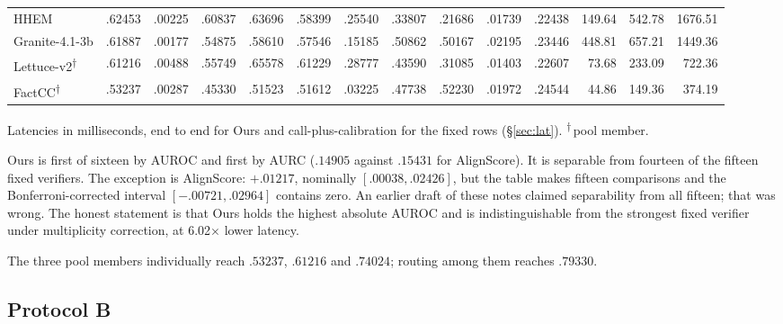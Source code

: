 \documentclass[10pt,a4paper]{article}
\newcommand{\ours}{\textsuperscript{$\dagger$}}
\newcommand{\fix}[1]{\textcolor{red!65!black}{#1}}
\begin{document}
\begin{center}
{\begin{tabular}{lrrrrrrrrrrrrr}
HHEM & .62453 & .00225 & .60837 & .63696 & .58399 & .25540 & .33807 & .21686 & .01739 & .22438 & 149.64 & 542.78 & 1676.51 \\
Granite-4.1-3b & .61887 & .00177 & .54875 & .58610 & .57546 & .15185 & .50862 & .50167 & .02195 & .23446 & 448.81 & 657.21 & 1449.36 \\
Lettuce-v2\ours & .61216 & .00488 & .55749 & .65578 & .61229 & .28777 & .43590 & .31085 & .01403 & .22607 & 73.68 & 233.09 & 722.36 \\
FactCC\ours & .53237 & .00287 & .45330 & .51523 & .51612 & .03225 & .47738 & .52230 & .01972 & .24544 & 44.86 & 149.36 & 374.19 \\
\bottomrule
\end{tabular}}
\end{center}

\noindent\footnotesize Latencies in milliseconds, end to end for Ours and call-plus-calibration
for the fixed rows (\S\ref{sec:lat}). \ours\,pool member.\normalsize

Ours is first of sixteen by AUROC and first by AURC ($.14905$ against $.15431$ for AlignScore).
It is separable from fourteen of the fifteen fixed verifiers. \fix{The exception is AlignScore:}
$+.01217$, nominally $[.00038,.02426]$, but the table makes fifteen comparisons and the
Bonferroni-corrected interval $[-.00721,.02964]$ contains zero. \fix{An earlier draft of these
notes claimed separability from all fifteen; that was wrong.} The honest statement is that Ours
holds the highest absolute AUROC and is indistinguishable from the strongest fixed verifier under
multiplicity correction, at 6.02$\times$ lower latency.

The three pool members individually reach $.53237$, $.61216$ and $.74024$; routing among them
reaches $.79330$.

\subsection{Protocol B}
\end{document}
